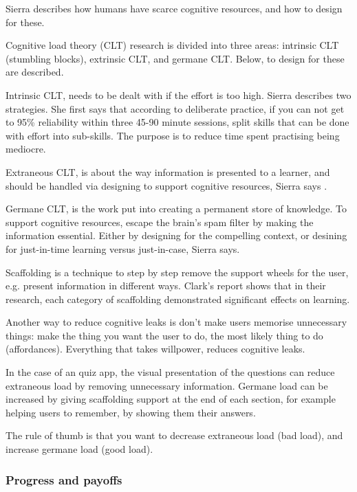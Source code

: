 Sierra \citep{sierra} describes how humans have scarce cognitive resources, and how to design for these.

Cognitive load theory (CLT) research is divided into three areas: intrinsic CLT (stumbling blocks), extrinsic CLT, and germane CLT. Below, to design for these are described.

Intrinsic CLT, needs to be dealt with if the effort is too high. Sierra \citep{sierra}describes two strategies. She first says that according to deliberate practice, if you can not get to 95\% reliability within three 45-90 minute sessions, split skills that can be done with effort into sub-skills. The purpose is to reduce time spent practising being mediocre.

Extraneous CLT, is about the way information is presented to a learner, and should be handled via designing to support cognitive resources, Sierra says \citep{sierra}.

Germane CLT, is the work put into creating a permanent store of knowledge. To support cognitive resources, escape the brain's spam filter by making the information essential. Either by designing for the compelling context, or desining for just-in-time learning versus just-in-case, Sierra says. \citep{sierra}

Scaffolding is a technique to step by step remove the support wheels for the user, e.g. present information in different ways. Clark's \citep{gates} report shows that in their research, each category of scaffolding demonstrated significant effects on learning.

Another way to reduce cognitive leaks is don't make users memorise unnecessary things: make the thing you want the user to do, the most likely thing to do (affordances). Everything that takes willpower, reduces cognitive leaks.

In the case of an quiz app, the visual presentation of the questions can reduce extraneous load by removing unnecessary information. Germane load can be increased by giving scaffolding support at the end of each section, for example helping users to remember, by showing them their answers.

The rule of thumb is that you want to decrease extraneous load (bad load), and increase germane load (good load).

\subsubsection{Progress and payoffs}

